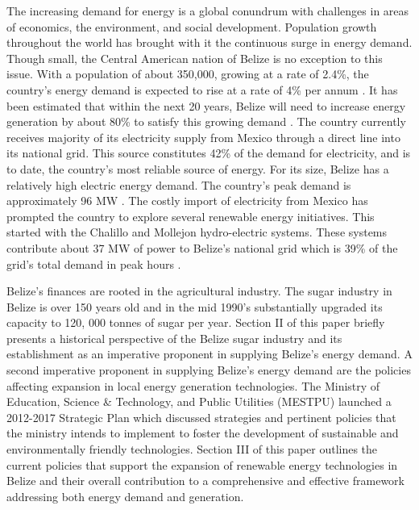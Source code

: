 \documentclass[twocolumn,10pt]{asme2e}
\begin{document}
The increasing demand for energy is a global conundrum with challenges in areas of economics, the environment, and social development.\cite{energy_future} Population growth throughout the world has brought with it the continuous surge in energy demand. Though small, the Central American nation of Belize is no exception to this issue. With a population of about 350,000, growing at a rate of 2.4\%, the country's energy demand is expected to rise at a rate of 4\% per annum \cite{sib_pop}. It has been estimated that within the next 20 years, Belize will need to increase energy generation by about 80\% to satisfy this growing demand \cite{idb_energy}. The country currently receives majority of its electricity supply from Mexico through a direct line into its national grid. This source constitutes 42\% of the demand for electricity, and is to date, the country's most reliable source of energy. For its size, Belize has a relatively high electric energy demand. The country's peak demand is approximately 96 MW \cite{bel_report}. The costly import of electricity from Mexico has prompted the country to explore several renewable energy initiatives. This started with the Chalillo and Mollejon hydro-electric systems. These systems contribute about 37 MW of power to Belize's national grid which is 39\% of the grid's total demand in peak hours \cite{bel_eng_policy}.

Belize's finances are rooted in the agricultural industry. The sugar industry in Belize is over 150 years old and in the mid 1990's substantially upgraded its capacity to 120, 000 tonnes of sugar per year. Section II of this paper briefly presents a historical perspective of the Belize sugar industry and its establishment as an imperative proponent in supplying Belize's energy demand. A second imperative proponent in supplying Belize's energy demand are the policies affecting expansion in local energy generation technologies. The Ministry of Education, Science \& Technology, and Public Utilities (MESTPU) launched a 2012-2017 Strategic Plan which discussed strategies and pertinent policies that the ministry intends to implement to foster the development of sustainable and environmentally friendly technologies\cite{ministry_strat}. Section III of this paper outlines the current policies that support the expansion of renewable energy technologies in Belize and their overall contribution to a comprehensive and effective framework addressing both energy demand and generation. 
\end{document}
